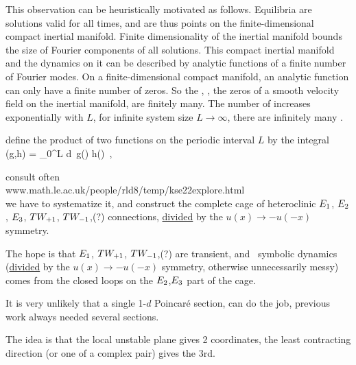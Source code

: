 This observation can be heuristically motivated as follows.
Equilibria are solutions valid for all times, and are thus points
on the finite-dimensional compact inertial manifold.
Finite dimensionality of the inertial manifold
bounds the size of Fourier components of all solutions.
This
compact inertial manifold and the dynamics on it can be
described by analytic functions of a finite number of Fourier modes.
On a finite-dimensional compact manifold,
an analytic function can only have a finite number
of zeros. So the {\eqva}, {\ie},
the zeros of a smooth velocity field on
the inertial manifold, are finitely many.
The number of {\eqva} increases exponentially with $L$,
for infinite system size $L \to \infty$,
there are infinitely many {\eqva}.

\bigskip

define the product of two functions on the
periodic interval $L$ by the integral
\beq
        (g,h) = \int_0^{L} d\pSpace\,
        g(\pSpace) h(\pSpace)
        \,,
        \label{rpo:innerProd}
\eeq


\bigskip

consult often
\\
        www.math.le.ac.uk/people/rld8/temp/kse22explore.html
\\
we have to systematize it, and
construct the complete cage of heteroclinic $E_{1}$, $E_{2}$, $E_{3}$,
$TW_{+1}$,
$TW_{-1}$,(?)
connections, \underline{divided} by the $u(x) \to - u(-x)$ symmetry.

The hope is that $E_{1}$,
$TW_{+1}$,
$TW_{-1}$,(?) are transient, and \rpo\ symbolic
dynamics (\underline{divided} by the $u(x) \to - u(-x)$ symmetry, otherwise
unnecessarily messy) comes from the closed loops on
the $E_{2}$,$E_{3}$ part of the cage.


It is very unlikely that a single 1-$d$ Poincar\'e section,
can do the job, previous work
always needed several sections.

The idea is that the local unstable plane gives 2 coordinates, the
least contracting direction (or one of a complex pair) gives the 3rd.

